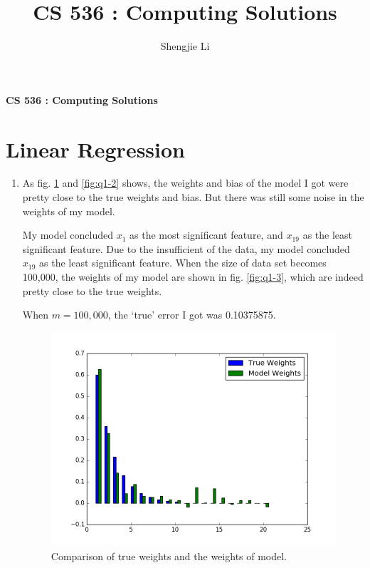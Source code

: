 \documentclass[letter, 12pt]{article}
\author{Shengjie Li}
\title{CS 536 : Computing Solutions}
\begin{document}
    \centerline{\textbf{CS 536 : Computing Solutions}}
    \section{Linear Regression}
    \begin{enumerate}
    	\item {}
    	\par{As fig. \ref{fig:q1-1} and \ref{fig:q1-2} shows, the weights and bias of the model I got were pretty close to the true weights and bias. But there was still some noise in the weights of my model.}
    	\par{My model concluded $ x_1 $ as the most significant feature, and $ x_{19} $ as the least significant feature. Due to the insufficient of the data, my model concluded $ x_{19} $ as the least significant feature. When the size of data set becomes 100,000, the weights of my model are shown in fig. \ref{fig:q1-3}, which are indeed pretty close to the true weights.}
    	\par{When $ m = 100,000 $, the `true' error I got was 0.10375875.}
    	\begin{figure}[H]
    		\centering
    		\begin{minipage}{.48\textwidth}
    			\centering
    			\includegraphics[width=\linewidth]{q1-1.png}
    			\caption{Comparison of true weights and the weights of model.}
    			\label{fig:q1-1}
    		\end{minipage}
	    	\begin{minipage}{.48\textwidth}
		    	\centering

\end{minipage}
\end{figure}
\end{enumerate}
\end{document}
